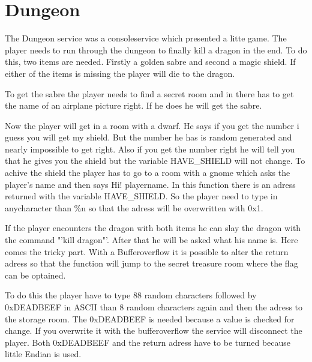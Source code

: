 \chapter{Dungeon}

The Dungeon service was a consoleservice which presented a litte game. The player needs to run through the dungeon to finally kill a dragon in the end. To do this, two items are needed. Firstly a golden sabre and second a magic shield. If either of the items is missing the player will die to the dragon.

To get the sabre the player needs to find a secret room and in there has to get the name of an airplane picture right. If he does he will get the sabre. 

Now the player will get in a room with a dwarf. He says if you get the number i guess you will get my shield. But the number he has is random generated and nearly impossible to get right. Also if you get the number right he will tell you that he gives you the shield but the variable HAVE\_SHIELD will not change. To achive the shield the player has to go to a room with a gnome which asks the player's name and then says Hi! playername. In this function there is an adress returned with the variable HAVE\_SHIELD. So the player need to type in anycharacter than \%n so that the adress will be overwritten with 0x1.

If the player encounters the dragon with both items he can slay the dragon with the command "'kill dragon"'. After that he will be asked what his name is. Here comes the tricky part. With a Bufferoverflow it is possible to alter the return adress so that the function will jump to the secret treasure room where the flag can be optained. 

To do this the player have to type 88 random characters followed by 0xDEADBEEF in ASCII than 8 random characters again and then the adress to the storage room. The 0xDEADBEEF is needed because a value is checked for change. If you overwrite it with the bufferoverflow the service will disconnect the player. Both 0xDEADBEEF and the return adress have to be turned because little Endian is used. 


